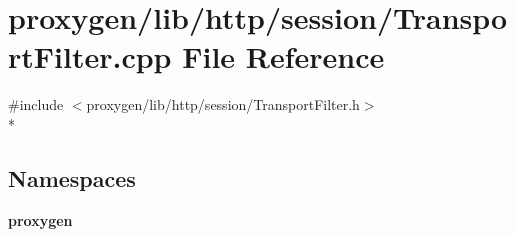 \section{proxygen/lib/http/session/\+Transport\+Filter.cpp File Reference}
\label{TransportFilter_8cpp}
{\ttfamily \#include $<$proxygen/lib/http/session/\+Transport\+Filter.\+h$>$}\\*
\subsection*{Namespaces}
\begin{DoxyCompactItemize}
\item 
 {\bf proxygen}
\end{DoxyCompactItemize}
